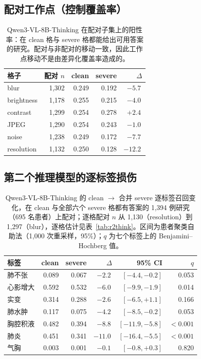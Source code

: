 \subsection*{配对工作点（控制覆盖率）}

\begin{table}[H]
\centering
\small
\caption{Qwen3-VL-8B-Thinking 在配对子集上的阳性率：在 clean 格与 severe 格都能给出可用答案的研究。配对与非配对的移动一致，因此工作点移动不是由差异化覆盖率造成的。}
\label{tab:r2posrate}
\begin{tabular}{lrrrr}
\toprule
格子 & 配对 $n$ & clean & severe & $\Delta$ \\
\midrule
blur & 1,302 & 0.249 & 0.192 & $-5.7$\,\pp{} \\
brightness & 1,178 & 0.255 & 0.215 & $-4.0$\,\pp{} \\
contrast & 1,299 & 0.254 & 0.278 & $+2.4$\,\pp{} \\
JPEG & 1,290 & 0.254 & 0.243 & $-1.0$\,\pp{} \\
noise & 1,238 & 0.249 & 0.172 & $-7.7$\,\pp{} \\
resolution & 1,132 & 0.250 & 0.128 & $\mathbf{-12.2}$\,\pp{} \\
\bottomrule
\end{tabular}
\end{table}

\subsection*{第二个推理模型的逐标签损伤}

\begin{table}[H]
\centering
\small
\caption{Qwen3-VL-8B-Thinking 的 clean $\rightarrow$ 合并 severe 逐标签召回变化，在 clean 与全部六个 severe 格都有答案的 1,394 例研究（695 名患者）上配对；逐格配对 $n$ 从 1,130（resolution）到 1,297（blur），逐格估计见表~\ref{tab:r2think}。区间为患者聚类自助法（1,000 次重采样，95\%）；$q$ 为七个标签上的 Benjamini--Hochberg 值。}
\label{tab:r2label}
\begin{tabular}{lrrrrr}
\toprule
标签 & clean & severe & $\Delta$ & 95\% CI & $q$ \\
\midrule
肺不张 & 0.089 & 0.067 & $-2.2$\,\pp{} & $[-4.4,-0.2]$ & 0.053 \\
心影增大 & 0.592 & 0.532 & $-6.0$\,\pp{} & $[-9.9,-1.9]$ & 0.014 \\
实变 & 0.314 & 0.288 & $-2.6$\,\pp{} & $[-6.5,+1.1]$ & 0.166 \\
肺水肿 & 0.117 & 0.075 & $-4.2$\,\pp{} & $[-8.5,-0.2]$ & 0.053 \\
胸腔积液 & 0.482 & 0.394 & $\mathbf{-8.8}$\,\pp{} & $[-11.9,-5.8]$ & $<0.001$ \\
肺炎 & 0.451 & 0.341 & $\mathbf{-11.0}$\,\pp{} & $[-16.4,-5.5]$ & $<0.001$ \\
气胸 & 0.003 & 0.001 & $-0.1$\,\pp{} & $[-0.8,+0.3]$ & 0.820 \\
\bottomrule
\end{tabular}
\end{table}
